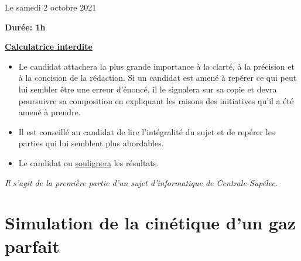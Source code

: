 \documentclass[twoside,french,11pt]{VcCours}
\begin{document}

\begin{center}
\large
Le samedi 2 octobre 2021

\bigskip
\textbf{Durée: 1h}

\bigskip
\large\underline{\textbf{Calculatrice interdite}}
\end{center}

\bigskip
\begin{itemize}
  \item Le candidat attachera la plus grande importance à la clarté, à la précision et à la concision de la rédaction. Si un candidat est amené à repérer ce qui peut lui sembler être une erreur d'énoncé, il le signalera sur sa copie et devra poursuivre sa composition en expliquant les raisons des initiatives qu'il a été amené à prendre.
  \item Il est conseillé au candidat de lire l'intégralité du sujet et de repérer les parties qui lui semblent plus abordables.
  \item Le candidat  ou \underline{soulignera} les résultats. 
  \end{itemize}
\separationTitre

% 

\emph{Il s'agit de la première partie d'un sujet d'informatique de Centrale-Supélec.}

\bigskip
\section*{Simulation de la cinétique d'un gaz parfait}
\end{document}
